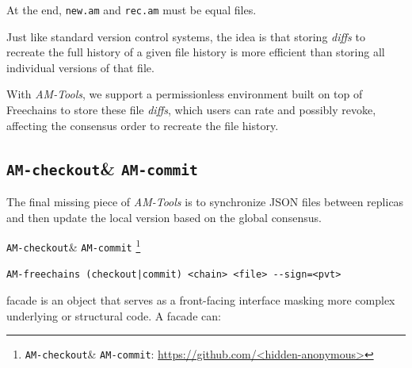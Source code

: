 \documentclass[12pt]{article}
\newcommand{\AMT}      {\emph{AM-Tools}\xspace}
\newcommand{\code}[1]  {\texttt{\footnotesize{#1}}}
\newcommand{\amcheckout} {\texttt{AM-checkout}\xspace}
\newcommand{\amcommit}   {\texttt{AM-commit}\xspace}
\begin{document}
At the end, \code{new.am} and \code{rec.am} must be equal files.

Just like standard version control systems, the idea is that storing
\emph{diffs} to recreate the full history of a given file history is more
efficient than storing all individual versions of that file.

With \AMT, we support a permissionless environment built on top of Freechains
to store these file \emph{diffs}, which users can rate and possibly revoke,
affecting the consensus order to recreate the file history.

\subsection{\amcheckout \& \amcommit}

The final missing piece of \AMT is to synchronize JSON files between replicas
and then update the local version based on the global consensus.

\amcheckout \& \amcommit%
    \footnote{\amcheckout \& \amcommit: \url{https://github.com/<hidden-anonymous>}}

\begin{verbatim}
AM-freechains (checkout|commit) <chain> <file> --sign=<pvt>
\end{verbatim}


facade is an object that serves as a front-facing interface masking more complex underlying or structural code. A facade can:



\end{document}
